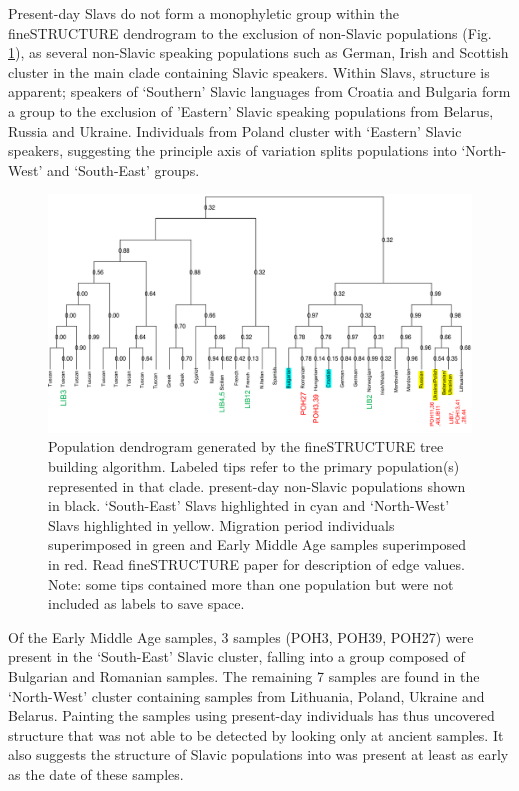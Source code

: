 Present-day Slavs do not form a monophyletic group within the fineSTRUCTURE dendrogram to the exclusion of non-Slavic populations (Fig. \ref{fig:tree_with_ancients}), as several non-Slavic speaking populations such as German, Irish and Scottish cluster in the main clade containing Slavic speakers. Within Slavs, structure is apparent; speakers of `Southern' Slavic languages from Croatia and Bulgaria form a group to the exclusion of 'Eastern' Slavic speaking populations from Belarus, Russia and Ukraine. Individuals from Poland cluster with `Eastern' Slavic speakers, suggesting the principle axis of variation splits populations into `North-West' and `South-East' groups. 

\begin{figure}[htp]
    \centering
    \includegraphics[width=1.0\textwidth]{../images/chapter5/tree_with_ancients.pdf}
    \caption{Population dendrogram generated by the fineSTRUCTURE tree building algorithm. Labeled tips refer to the primary population(s) represented in that clade. present-day non-Slavic populations shown in black. `South-East' Slavs highlighted in cyan and `North-West' Slavs highlighted in yellow. Migration period individuals superimposed in green and Early Middle Age samples superimposed in red. Read fineSTRUCTURE paper for description of edge values. Note: some tips contained more than one population but were not included as labels to save space.}
    \label{fig:tree_with_ancients}
\end{figure} 

Of the Early Middle Age samples, 3 samples (POH3, POH39, POH27) were present in the `South-East' Slavic cluster, falling into a group composed of Bulgarian and Romanian samples. The remaining 7 samples are found in the `North-West' cluster containing samples from Lithuania, Poland, Ukraine and Belarus. Painting the samples using present-day individuals has thus uncovered structure that was not able to be detected by looking only at ancient samples. It also suggests the structure of Slavic populations into was present at least as early as the date of these samples. 


